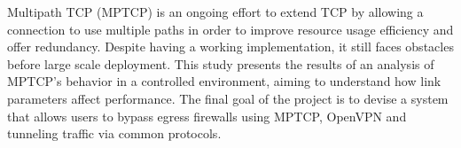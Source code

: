 Multipath TCP (MPTCP) is an ongoing effort to extend TCP by allowing a
connection to use multiple paths in order to improve resource usage efficiency
and offer redundancy. Despite having a working implementation, it still faces
obstacles before large scale deployment. This study presents the results of an
analysis of MPTCP's behavior in a controlled environment, aiming to understand
how link parameters affect performance. The final goal of the project is to
devise a system that allows users to bypass egress firewalls using MPTCP,
OpenVPN and tunneling traffic via common protocols.
